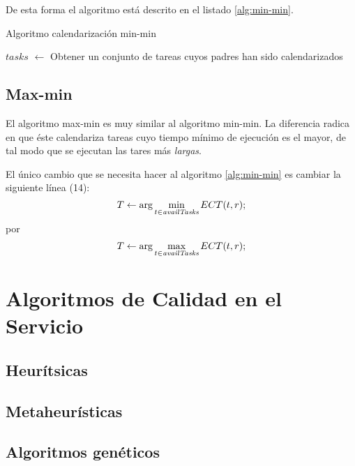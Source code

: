 De esta forma el algoritmo está descrito en el listado \ref{alg:min-min}.

\begin{algorithm}
\label{alg:min-min}
\caption{Algoritmo calendarización min-min}


 {
	$tasks$ $\leftarrow$ Obtener un conjunto de tareas cuyos padres han sido calendarizados\;
	\;
}

\end{algorithm}

\subsection{Max-min}
El algoritmo max-min es muy similar al algoritmo min-min. La diferencia radica en que éste calendariza tareas cuyo tiempo mínimo de ejecución es el mayor, de tal modo que se ejecutan las tares más \emph{largas}.

El único cambio que se necesita hacer al algoritmo \ref{alg:min-min} es cambiar la siguiente línea (14):
\[T \leftarrow \arg\min_{t \in \emph{availTasks}}ECT(t,r);\]
por
\[T \leftarrow \arg\max_{t \in \emph{availTasks}}ECT(t,r);\]


\section{Algoritmos de Calidad en el Servicio}


\subsection{Heurítsicas}

\subsection{Metaheurísticas}


\subsection{Algoritmos genéticos}
